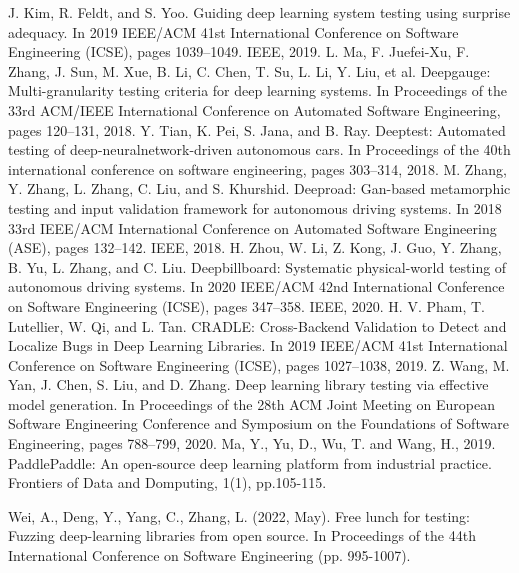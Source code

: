 \documentclass[sigconf]{acmart}
\begin{document}
\begin{thebibliography}{9}
 J. Kim, R. Feldt, and S. Yoo. Guiding deep learning system testing using surprise
adequacy. In 2019 IEEE/ACM 41st International Conference on Software Engineering
(ICSE), pages 1039–1049. IEEE, 2019.
 L. Ma, F. Juefei-Xu, F. Zhang, J. Sun, M. Xue, B. Li, C. Chen, T. Su, L. Li, Y. Liu,
et al. Deepgauge: Multi-granularity testing criteria for deep learning systems. In
Proceedings of the 33rd ACM/IEEE International Conference on Automated Software
Engineering, pages 120–131, 2018.
 Y. Tian, K. Pei, S. Jana, and B. Ray. Deeptest: Automated testing of deep-neuralnetwork-driven autonomous cars. In Proceedings of the 40th international conference on software engineering, pages 303–314, 2018.
 M. Zhang, Y. Zhang, L. Zhang, C. Liu, and S. Khurshid. Deeproad: Gan-based
metamorphic testing and input validation framework for autonomous driving
systems. In 2018 33rd IEEE/ACM International Conference on Automated Software
Engineering (ASE), pages 132–142. IEEE, 2018.
 H. Zhou, W. Li, Z. Kong, J. Guo, Y. Zhang, B. Yu, L. Zhang, and C. Liu. Deepbillboard: Systematic physical-world testing of autonomous driving systems. In 2020
IEEE/ACM 42nd International Conference on Software Engineering (ICSE), pages
347–358. IEEE, 2020.
 H. V. Pham, T. Lutellier, W. Qi, and L. Tan. CRADLE: Cross-Backend Validation
to Detect and Localize Bugs in Deep Learning Libraries. In 2019 IEEE/ACM 41st
International Conference on Software Engineering (ICSE), pages 1027–1038, 2019.
 Z. Wang, M. Yan, J. Chen, S. Liu, and D. Zhang. Deep learning library testing
via effective model generation. In Proceedings of the 28th ACM Joint Meeting on
European Software Engineering Conference and Symposium on the Foundations of
Software Engineering, pages 788–799, 2020.
 Ma, Y., Yu, D., Wu, T. and Wang, H., 2019. PaddlePaddle: An open-source deep learning platform from industrial practice. Frontiers of Data and Domputing, 1(1), pp.105-115.

 Wei, A., Deng, Y., Yang, C.,  Zhang, L. (2022, May). Free lunch for testing: Fuzzing deep-learning libraries from open source. In Proceedings of the 44th International Conference on Software Engineering (pp. 995-1007).
\end{thebibliography}
\end{document}
